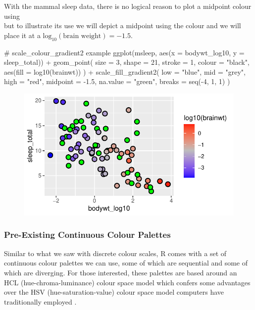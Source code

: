 With the mammal sleep data, there is no logical reason to plot a midpoint colour using \\  but to illustrate its use we will depict a midpoint using the colour  and we will place it at a $\text{log}_{10}(\text{brain weight}) = -1.5$.

\begin{inR}
# scale_colour_gradient2 example
ggplot(msleep, aes(x = bodywt_log10, y = sleep_total)) +
  geom_point(
    size = 3, shape = 21, stroke = 1, colour = "black",
    aes(fill = log10(brainwt))
  ) +
  scale_fill_gradient2(
    low = "blue",
    mid = "grey",
    high = "red",
    midpoint = -1.5,
    na.value = "green", 
    breaks = seq(-4, 1, 1)
  )
\end{inR}

\vspace{2em}

\begin{figure}[H]
\includegraphics[scale = .75]{graphics/ch2Figs/ggEx_28.pdf}
\end{figure}

\subsubsection{Pre-Existing Continuous Colour Palettes}

Similar to what we saw with discrete colour scales, R comes with a set of continuous colour palettes we can use, some of which are sequential and some of which are diverging. For those interested, these palettes are based around an HCL (hue-chroma-luminance) colour space model which confers some advantages over the HSV (hue-saturation-value) colour space model computers have traditionally employed \parencite{Zeileis2019}.

